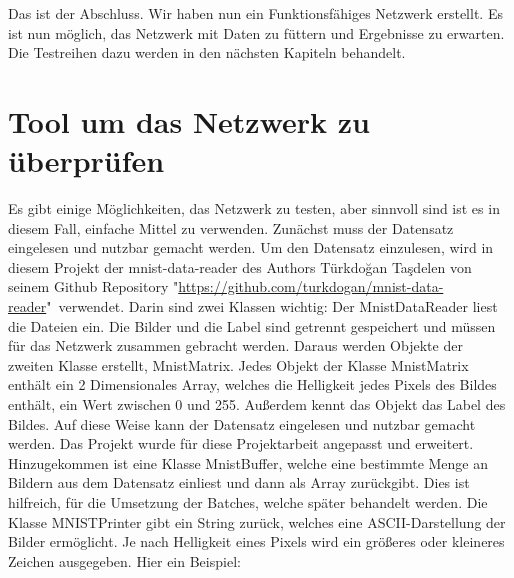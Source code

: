 \documentclass[12pt]{article}
\begin{document}
Das ist der Abschluss. Wir haben nun ein Funktionsfähiges Netzwerk erstellt. Es ist nun möglich, das Netzwerk mit Daten zu füttern und Ergebnisse zu erwarten. Die Testreihen dazu werden in den nächsten Kapiteln behandelt.\section{Tool um das Netzwerk zu überprüfen}
Es gibt einige Möglichkeiten, das Netzwerk zu testen, aber sinnvoll sind ist es in diesem Fall, einfache Mittel zu verwenden.
Zunächst muss der Datensatz eingelesen und nutzbar gemacht werden.
Um den Datensatz einzulesen, wird in diesem Projekt der mnist-data-reader des Authors Türkdoğan Taşdelen von seinem Github Repository \sloppy "\url{https://github.com/turkdogan/mnist-data-reader}" verwendet. Darin sind zwei Klassen wichtig:  
Der MnistDataReader liest die Dateien ein. Die Bilder und die Label sind getrennt gespeichert und müssen für das Netzwerk zusammen gebracht werden. Daraus werden Objekte der zweiten Klasse erstellt, MnistMatrix. Jedes Objekt der Klasse MnistMatrix enthält ein 2 Dimensionales Array, welches die Helligkeit jedes Pixels des Bildes enthält, ein Wert zwischen 0 und 255. Außerdem kennt das Objekt das Label des Bildes.
Auf diese Weise kann der Datensatz eingelesen und nutzbar gemacht werden.
Das Projekt wurde für diese Projektarbeit angepasst und erweitert. Hinzugekommen ist eine Klasse MnistBuffer, welche eine bestimmte Menge an Bildern aus dem Datensatz einliest und dann als Array zurückgibt. Dies ist hilfreich, für die Umsetzung der Batches, welche später behandelt werden.
Die Klasse MNISTPrinter gibt ein String zurück, welches eine ASCII-Darstellung der Bilder ermöglicht. Je nach Helligkeit eines Pixels wird ein größeres oder kleineres Zeichen ausgegeben. Hier ein Beispiel:
\end{document}
